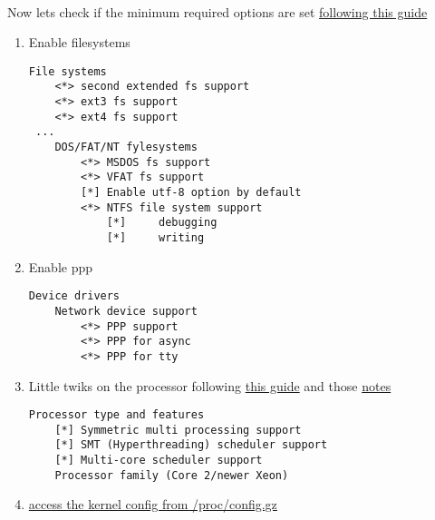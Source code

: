 \documentclass[11pt,a4paper]{article}
\begin{document}
                \newpage
                \paragraph{} Now lets check if the minimum required options are set \href{https://wiki.gentoo.org/wiki/Handbook:AMD64/Installation/Kernel#Activating_required_options}{following this guide}

                \begin{enumerate}

                    \item Enable filesystems
                        \begin{lstlisting}[style=KernelConfig]
 File systems
    <*> second extended fs support
    <*> ext3 fs support
    <*> ext4 fs support
 ...
    DOS/FAT/NT fylesystems
        <*> MSDOS fs support
        <*> VFAT fs support
        [*] Enable utf-8 option by default
        <*> NTFS file system support
            [*]     debugging
            [*]     writing
                        \end{lstlisting}

                    \newpage
                    \item Enable ppp

                        \begin{lstlisting}[style=KernelConfig]
 Device drivers
    Network device support
        <*> PPP support
        <*> PPP for async
        <*> PPP for tty
                         \end{lstlisting}


                     \newpage
                     \item Little twiks on the processor following \href{https://wiki.gentoo.org/wiki/Kernel/Gentoo_Kernel_Configuration_Guide#Multiprocessor.2C_Hyper-Threading_and_multi-core_systems}{this guide} and those \href{https://forums.gentoo.org/viewtopic-t-939150-start-0.html}{notes}

                        \begin{lstlisting}[style=KernelConfig]
 Processor type and features
    [*] Symmetric multi processing support
    [*] SMT (Hyperthreading) scheduler support
    [*] Multi-core scheduler support
    Processor family (Core 2/newer Xeon)
                        \end{lstlisting}

                    \newpage
                    \item \href{https://wiki.gentoo.org/wiki/Kernel/IKCONFIG_Support}{access the kernel config from /proc/config.gz}


\end{enumerate}
\end{document}

